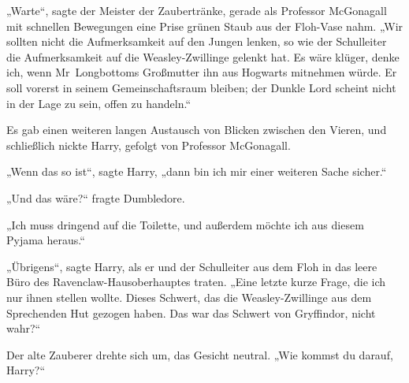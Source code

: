 „Warte“, sagte der Meister der Zaubertränke, gerade als Professor McGonagall mit schnellen Bewegungen eine Prise grünen Staub aus der Floh-Vase nahm.
„Wir sollten nicht die Aufmerksamkeit auf den Jungen lenken, so wie der Schulleiter die Aufmerksamkeit auf die Weasley-Zwillinge gelenkt hat. Es wäre klüger, denke ich, wenn Mr~Longbottoms Großmutter ihn aus Hogwarts mitnehmen würde. Er soll vorerst in seinem Gemeinschaftsraum bleiben; der Dunkle Lord scheint nicht in der Lage zu sein, offen zu handeln.“

Es gab einen weiteren langen Austausch von Blicken zwischen den Vieren, und schließlich nickte Harry, gefolgt von Professor McGonagall.

„Wenn das so ist“, sagte Harry, „dann bin ich mir einer weiteren Sache sicher.“

„Und das wäre?“ fragte Dumbledore.

„Ich muss dringend auf die Toilette, und außerdem möchte ich aus diesem Pyjama heraus.“

\later

„Übrigens“, sagte Harry, als er und der Schulleiter aus dem Floh in das leere Büro des Ravenclaw-Hausoberhauptes traten.
„Eine letzte kurze Frage, die ich nur ihnen stellen wollte. Dieses Schwert, das die Weasley-Zwillinge aus dem Sprechenden Hut gezogen haben. Das war das Schwert von Gryffindor, nicht wahr?“

Der alte Zauberer drehte sich um, das Gesicht neutral.
„Wie kommst du darauf, Harry?“


